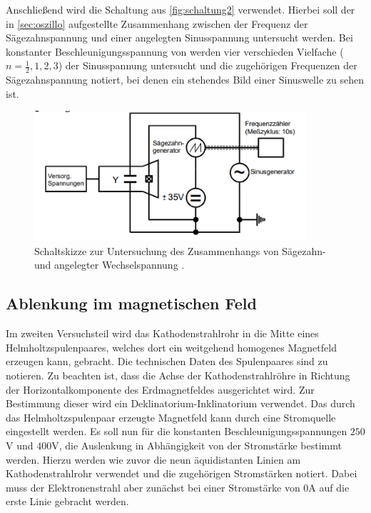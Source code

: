     Anschließend wird die Schaltung aus \autoref{fig:schaltung2} verwendet. Hierbei soll der in \autoref{sec:oszillo} aufgestellte
    Zusammenhang zwischen der Frequenz der Sägezahnspannung und einer angelegten Sinusspannung untersucht werden. 
    Bei konstanter Beschleunigungsspannung von werden vier verschieden Vielfache ($n = \frac{1}{2}, 1, 2, 3$) der Sinusspannung untersucht
    und die zugehörigen Frequenzen der Sägezahnspannung notiert, bei denen ein stehendes Bild einer Sinuswelle zu sehen ist.
     \begin{figure}
        \centering
        \includegraphics[width=0.9\textwidth]{content/wechselschaltung.png}
        \caption{Schaltskizze zur Untersuchung des Zusammenhangs von Sägezahn- und angelegter Wechselspannung \cite{V501-und-V502}.}
        \label{fig:schaltung2}
    \end{figure}
    \subsection{Ablenkung im magnetischen Feld}
    Im zweiten Versuchsteil wird das Kathodenstrahlrohr in die Mitte eines Helmholtzspulenpaares, welches dort ein weitgehend homogenes Magnetfeld
    erzeugen kann, gebracht. Die technischen Daten des Spulenpaares sind zu notieren. Zu beachten ist, dass die Achse der Kathodenstrahlröhre in 
    Richtung der Horizontalkomponente des Erdmagnetfeldes ausgerichtet wird. Zur Bestimmung dieser wird ein Deklinatorium-Inklinatorium
    verwendet. Das durch das Helmholtzspulenpaar erzeugte Magnetfeld kann durch eine Stromquelle eingestellt werden. Es soll nun für die 
    konstanten Beschleunigungsspannungen $250$V und $400$V, die Auslenkung in Abhängigkeit von der Stromstärke bestimmt werden. 
    Hierzu werden wie zuvor die neun äquidistanten Linien am Kathodenstrahlrohr verwendet und die zugehörigen Stromstärken notiert.
    Dabei muss der Elektronenstrahl aber zunächst bei einer Stromstärke von $0$A auf die erste Linie gebracht werden.
    
